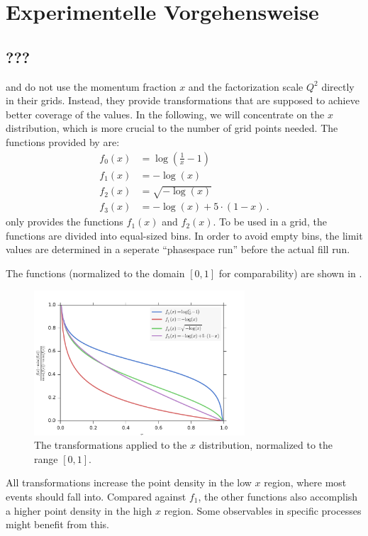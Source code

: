 
\chapter{Experimentelle Vorgehensweise}
\section{???}
\label{sec:xtransform}
\appl{} and \fnlo{} do not use the momentum fraction $x$ and the factorization scale $Q^2$ directly in their grids.
Instead, they provide transformations that are supposed to achieve better coverage of the values.
In the following, we will concentrate on the $x$ distribution, which is more crucial to the number of grid points needed.
The functions provided by \appl{} are:
%
\begin{align}
	f_0(x)	&= \log(\frac{1}{x} -1) \\
	f_1(x)	&= -\log(x) \\
	f_2(x)	&= \sqrt{-\log(x)} \\
	f_3(x)	&= -\log(x) + 5 \cdot (1-x) \, .
\end{align}
%
\fnlo{} only provides the functions $f_1(x)$ and $f_2(x)$.
To be used in a grid, the functions are divided into equal-sized bins.
In order to avoid empty bins, the limit values are determined in a seperate \enquote{phasespace run} before the actual fill run.

The functions (normalized to the domain $[0,1]$ for comparability) are shown in .
%
\begin{figure}[]
	\includegraphics[width=0.7\textwidth]{images/xtransform.pdf}
	\caption{The transformations applied to the $x$ distribution, normalized to the range $[0,1]$.}
	\label{fig:xtransform}
\end{figure}
%
All transformations increase the point density in the low $x$ region, where most events should fall into.
Compared against $f_1$, the other functions also accomplish a higher point density in the high $x$ region.
Some observables in specific processes might benefit from this.


